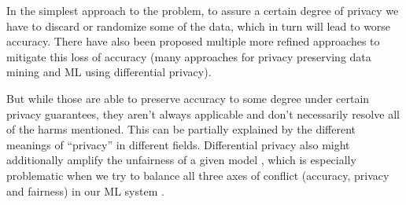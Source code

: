	In the simplest approach to the problem, to assure a certain degree of privacy we have to discard or randomize some of the data, which in turn will lead to worse accuracy.
	There have also been proposed multiple more refined approaches to mitigate this loss of accuracy (many approaches for privacy preserving data mining and ML \eg \cite{duchi2014privacy} using differential privacy).

	But while those are able to preserve accuracy to some degree under certain privacy guarantees, they aren't always applicable and don't necessarily resolve all of the harms mentioned.
	This can be partially explained by the different meanings of \enquote{privacy} in different fields.
	Differential privacy also might additionally amplify the unfairness of a given model \cite{bagdasaryan2019differential}, which is especially problematic when we try to balance all three axes of conflict (accuracy, privacy and fairness) in our ML system \cite{Chester2020}.